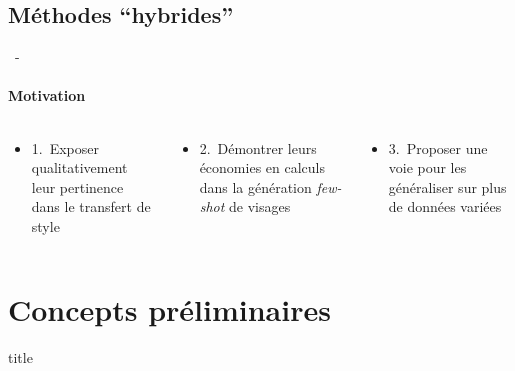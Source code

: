 \documentclass[aspectratio=169, 22pt]{beamer}
\begin{document}
\subsection{Méthodes ``hybrides''}
\begin{frame}{\secname~- \subsecname}
  \framesubtitle{Motivation}
  \begin{columns}
    \begin{column}{0.3\linewidth}
      \begin{itemize}
        \centering
        \item \small 1. Exposer \alert{qualitativement} leur pertinence dans le transfert de style
      \end{itemize}
    \end{column}
    \begin{column}{0.3\linewidth}
      \begin{itemize}
        \centering
      \item \small 2. Démontrer leurs \alert{économies en calculs} dans la génération \emph{few-shot} de visages
      \end{itemize}      
    \end{column}
    \begin{column}{0.3\linewidth}
      \begin{itemize}
        \centering
      \item \small 3. Proposer une voie pour les \alert{généraliser} sur plus de données variées
      \end{itemize}      
    \end{column}
  \end{columns}
\end{frame}


\section{Concepts préliminaires}
\begin{frame}
  \begin{beamercolorbox}[sep=15pt,center,shadow=true,rounded=true]{title}
    \LARGE\bfseries \secname
  \end{beamercolorbox}
\end{frame}
\end{document}
